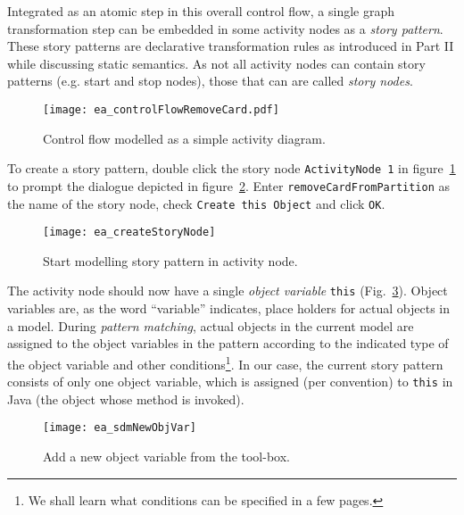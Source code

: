\label{story-pattern}
Integrated as an atomic step in this overall control flow, a single graph  transformation step can be embedded in some activity nodes as a
\emph{story pattern}.  These story patterns are declarative transformation rules as introduced in Part II while discussing static semantics.  As not all 
activity nodes can contain story patterns (e.g. start and stop nodes), those that can are called \emph{story nodes}.

\begin{figure}[htp]
\begin{center}
  \texttt{[image: ea\_controlFlowRemoveCard.pdf]}
  \caption{Control flow modelled as a simple activity diagram.}  
  \label{fig:sdm_complete_control_flow_simple}
\end{center}
\end{figure}

To create a story pattern, double click the story node \texttt{ActivityNode 1} in figure~\ref{fig:sdm_complete_control_flow_simple} to prompt the dialogue
depicted in figure~\ref{fig:story_pattern}.  Enter \texttt{remove\-Card\-From\-Partition} as the name of the story node, check \texttt{Create this Object} and
click \texttt{OK}.

\begin{figure}[htpb]
\begin{center} 
  \texttt{[image: ea\_createStoryNode]}
  \caption{Start modelling story pattern in activity node.}  
  \label{fig:story_pattern}
\end{center}
\end{figure}

The activity node should now have a single \emph{object variable} \texttt{this} (Fig.~\ref{fig:tool_box}). Object variables are, as the
word ``variable'' indicates, place holders for actual objects in a model.  During \emph{pattern matching},  actual objects in the 
current model are assigned to the object variables in the pattern according to  the indicated type of the object variable and other conditions\footnote{We shall
learn what conditions can be specified in a few pages.}.  In our case, the current story pattern consists of only one object variable, which is assigned (per
convention) to \texttt{this} in Java (the object whose method is invoked).

\begin{figure}[htp]
\begin{center}
  \texttt{[image: ea\_sdmNewObjVar]}
  \caption{Add a new object variable from the tool-box.}  
  \label{fig:tool_box}
\end{center}
\end{figure}

